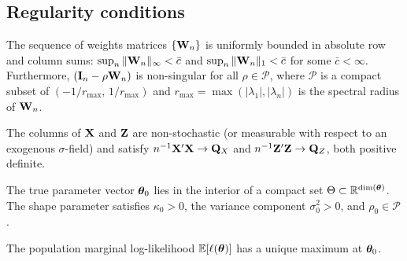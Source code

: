 \subsection{Regularity conditions}\label{sec:model_regularity}

\begin{assumption}\label{ass:W}
  The sequence of weights matrices $\{\mathbf{W}_n\}$ is uniformly bounded in absolute row and column sums: $\sup_n \|\mathbf{W}_n\|_\infty < \bar{c}$ and $\sup_n \|\mathbf{W}_n\|_1 < \bar{c}$ for some $\bar{c} < \infty$.
  Furthermore, $(\mathbf{I}_n - \rho\mathbf{W}_n)$ is non-singular for all $\rho \in \mathcal{P}$, where $\mathcal{P}$ is a compact subset of $(-1/r_{\max},\,1/r_{\max})$ and $r_{\max} = \max(|\lambda_1|,|\lambda_n|)$ is the spectral radius of $\mathbf{W}_n$.
\end{assumption}

\begin{assumption}\label{ass:X}
  The columns of $\mathbf{X}$ and $\mathbf{Z}$ are non-stochastic (or measurable with respect to an exogenous $\sigma$-field) and satisfy $n^{-1}\mathbf{X}'\mathbf{X} \to \mathbf{Q}_X$ and $n^{-1}\mathbf{Z}'\mathbf{Z} \to \mathbf{Q}_Z$, both positive definite.
\end{assumption}

\begin{assumption}\label{ass:param}
  The true parameter vector $\boldsymbol{\theta}_0$ lies in the interior of a compact set $\Theta \subset \mathbb{R}^{\dim(\boldsymbol{\theta})}$.
  The shape parameter satisfies $\kappa_0 > 0$, the variance component $\sigma_0^2 > 0$, and $\rho_0 \in \mathcal{P}$.
\end{assumption}

\begin{assumption}[Identification]\label{ass:identification}
  The population marginal log-likelihood $\mathbb{E}[\ell(\boldsymbol{\theta})]$ has a unique maximum at $\boldsymbol{\theta}_0$.
\end{assumption}
